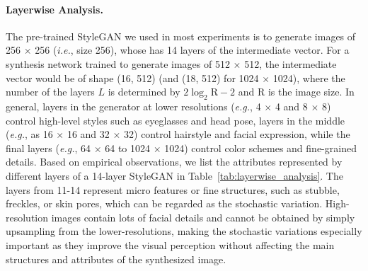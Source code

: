 \documentclass[final]{cvpr}
\def\eg{\emph{e.g.}}
\def\ie{\emph{i.e.}}
\begin{document}
\vspace{-5pt}
\paragraph{Layerwise Analysis.} 
The pre-trained StyleGAN we used in most experiments is to generate images of 256 $\times$ 256 (\ie, size 256), whose has 14 layers of the intermediate vector.
For a synthesis network trained to generate images of 512 $\times$ 512, the intermediate vector would be of shape (16, 512) (and (18, 512) for 1024 $\times$ 1024), where the number of the layers $L$ is determined by $2\log_2\mathrm{R}-2$ and $\mathrm{R}$ is the image size.
In general, layers in the generator at lower resolutions (\eg, 4 $\times$ 4 and 8 $\times$ 8) control high-level styles such as eyeglasses and head pose,
layers in the middle (\eg, as 16 $\times$ 16 and 32 $\times$ 32) control hairstyle and facial expression, while the final layers (\eg, 64 $\times$ 64 to 1024 $\times$ 1024) control color schemes and fine-grained details.
Based on empirical observations, we list the attributes represented by different layers of a 14-layer StyleGAN in Table~\ref{tab:layerwise_analysis}.
The layers from 11-14 represent micro features or fine structures, such as stubble, freckles, or skin pores, which can be regarded as the stochastic variation.
High-resolution images contain lots of facial details and cannot be obtained by simply upsampling from the lower-resolutions, making the stochastic variations especially important as they improve the visual perception without affecting the main structures and attributes of the synthesized image.

\begin{table}[th]
\centering
\caption{The Empirical Layerwise Analysis of a 14-layer StyleGAN Generator. The 13-th and 14-th layers are omitted since there is basically no visible difference.}
\label{tab:layerwise_analysis}
\end{table}
\end{document}
